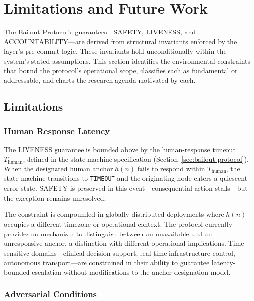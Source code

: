 \section{Limitations and Future Work}\label{sec:limitations}

The Bailout Protocol's guarantees---SAFETY, LIVENESS, and ACCOUNTABILITY---are derived from structural invariants enforced by the \fact{} layer's pre-commit logic. These invariants hold unconditionally within the system's stated assumptions. This section identifies the environmental constraints that bound the protocol's operational scope, classifies each as fundamental or addressable, and charts the research agenda motivated by each.

\subsection{Limitations}\label{sec:limitations:items}

\subsubsection{Human Response Latency}
\label{sec:lim:latency}

The LIVENESS guarantee is bounded above by the human-response timeout $T_{\text{human}}$, defined in the state-machine specification (Section~\ref{sec:bailout-protocol}). When the designated human anchor $h(n)$ fails to respond within $T_{\text{human}}$, the state machine transitions to \texttt{TIMEOUT} and the originating node enters a quiescent error state. SAFETY is preserved in this event---consequential action stalls---but the exception remains unresolved.

The constraint is compounded in globally distributed deployments where $h(n)$ occupies a different timezone or operational context. The protocol currently provides no mechanism to distinguish between an unavailable and an unresponsive anchor, a distinction with different operational implications. Time-sensitive domains---clinical decision support, real-time infrastructure control, autonomous transport---are constrained in their ability to guarantee latency-bounded escalation without modifications to the anchor designation model.

\subsubsection{Adversarial Conditions}
\label{sec:lim:adversarial}

